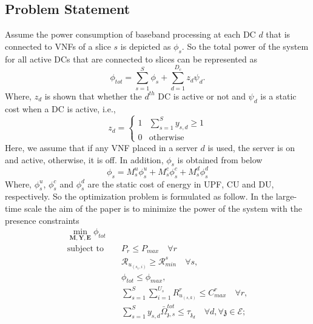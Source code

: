 \documentclass{article}
\begin{document}
\subsection{Problem Statement}
Assume the power consumption of baseband processing at each DC $d$ that is connected to VNFs of a slice $s$ is depicted as
$\phi_{s}$. So the total power of the system for all active DCs that are connected to slices can be represented as
\begin{equation*}
\textstyle \phi_{tot} = \sum_{s=1}^{S}\phi_{s} + \sum_{d=1}^{D_c}z_d \psi_d .
\end{equation*}
Where, $z_d$ is shown that whether the $d^{th}$ DC is active or not and $\psi_d$ is a static cost when a DC is active, i.e.,
\begin{equation}
  z_d =
    \begin{cases}
      1 & \sum_{s=1}^{S}y_{s,d} \geq 1 \\
      0 & \text{otherwise}
    \end{cases}       
\end{equation}  
Here, we assume that if any VNF placed in a server $d$ is used, the server is on and active, otherwise, it is off.
In addition, $\phi_{s}$ is obtained from below
\begin{equation}
\phi_{s} = M_s^u \phi_s^u + M_s^c \phi_s^c+ M_s^d \phi_s^d
\end{equation}
Where, $\phi_s^u$, $\phi_s^c$ and $\phi_s^d$ are the static cost of energy in UPF, CU and DU, respectively. 
So the optimization problem is formulated as follow.
In the large-time scale the aim of the paper is to minimize the power of the system with the presence constraints
\begin{subequations}
\begin{alignat}{4}
\min\limits_{ \boldsymbol{M}, \boldsymbol{Y}, \boldsymbol{E} } \phi_{tot}   \quad &   \ \\
\text{subject to} \quad  &  P_r \leq P_{max} \quad \forall r
 \label{c11} \\
 &\mathcal{R}_{u_{(s_1,i)}} \geq  \mathcal{R}_{min}^{s} \quad \forall s, \label{c13} \\
& \phi_{tot}  \leq \phi_{max}, \label{c19} \\
& \sum_{s=1}^{S}\sum_{i=1}^{U_s}R_{u_{(s,k)}}^r \leq C_{max}^r \quad \forall r, \label{c15}\\ 
 &\textstyle \sum_{s=1}^{S} y_{s,d} \bar{\Omega}_{\mathfrak{z},s}^{tot}  \leq   \tau_{\mathfrak{z}_d} 
 \quad \forall d, \forall \mathfrak{z}\in \mathcal{E}; \label{c20}
\end{alignat}
\label{constraints}
\end{subequations}
\end{document}
